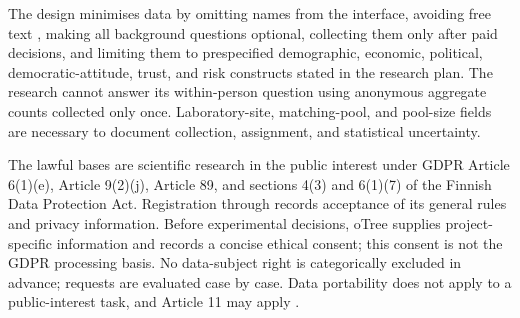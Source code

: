 The design minimises data by omitting names from the interface, avoiding free text , making all background questions optional, collecting them only after paid decisions, and limiting them to prespecified demographic, economic, political, democratic-attitude, trust, and risk constructs stated in the research plan. The research cannot answer its within-person question using anonymous aggregate counts collected only once.  Laboratory-site, matching-pool, and pool-size fields are necessary to document collection, assignment, and statistical uncertainty.

The lawful bases are scientific research in the public interest under GDPR Article 6(1)(e), Article 9(2)(j), Article 89, and sections 4(3) and 6(1)(7) of the Finnish Data Protection Act.  Registration through  records acceptance of its general rules and privacy information. Before experimental decisions, oTree supplies project-specific information and records a concise ethical consent; this consent is not the GDPR processing basis. No data-subject right is categorically excluded in advance; requests are evaluated case by case. Data portability does not apply to a public-interest task, and Article 11 may apply .


